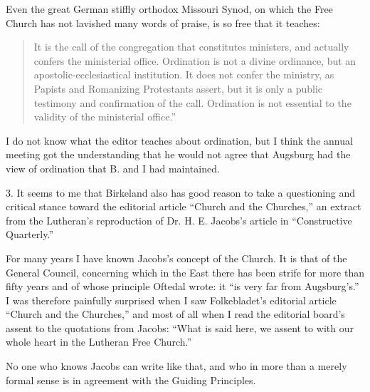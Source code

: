 Even the great German stiffly orthodox Missouri Synod, on which the Free Church has not lavished many words of praise, is so free that it teaches:

\begin{quote}It is the call of the congregation that constitutes ministers, and actually confers the ministerial office. Ordination is not a divine ordinance, but an apostolic-ecclesiastical institution. It does not confer the ministry, as Papists and Romanizing Protestants assert, but it is only a public testimony and confirmation of the call. Ordination is not essential to the validity of the ministerial office.”
\end{quote}

I do not know what the editor teaches about ordination, but I think the annual meeting got the understanding that he would not agree that Augsburg had the view of ordination that B. and I had maintained.

3. It seems to me that Birkeland also has good reason to take a questioning and critical stance toward the editorial article “Church and the Churches,” an extract from the Lutheran’s reproduction of Dr. H. E. Jacobs’s article in “Constructive Quarterly.”

For many years I have known Jacobs’s concept of the Church. It is that of the General Council, concerning which in the East there has been strife for more than fifty years and of whose principle Oftedal wrote: it “is very far from Augsburg’s.” I was therefore painfully surprised when I saw Folkebladet’s editorial article “Church and the Churches,” and most of all when I read the editorial board’s assent to the quotations from Jacobs: “What is said here, we assent to with our whole heart in the Lutheran Free Church.”

No one who knows Jacobs can write like that, and who in more than a merely formal sense is in agreement with the Guiding Principles.

